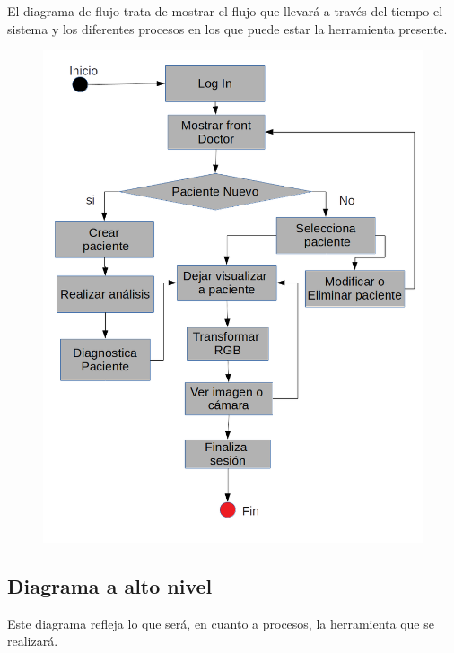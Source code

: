 \documentclass[10pt]{article}
\begin{document}
El diagrama de flujo trata de mostrar el flujo que llevará a través del tiempo el sistema y los diferentes procesos en los que puede estar la herramienta presente.

\begin{figure}[H]
	\begin{center}
\includegraphics[scale = 0.70]{Imagenes/flow.png}
	\end{center} 
\end{figure}

\subsection{Diagrama a alto nivel}

Este diagrama refleja lo que será, en cuanto a procesos, la herramienta que se realizará.
\end{document}
